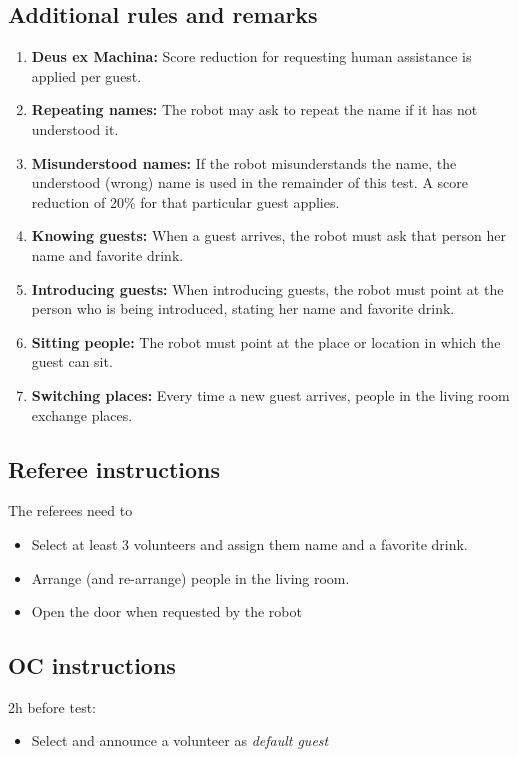\subsection{Additional rules and remarks}
\begin{enumerate}[nosep]
	\item \textbf{Deus ex Machina:} Score reduction for requesting human assistance is applied per guest.

	\item \textbf{Repeating names:} The robot may ask to repeat the name if it has not understood it.
	
	\item \textbf{Misunderstood names:} If the robot misunderstands the name, the understood (wrong) name is used in the remainder of this test.
	A score reduction of 20\%  for that particular guest applies.
	
	\item \textbf{Knowing guests:} When a guest arrives, the robot must ask that person her name and favorite drink.

	\item \textbf{Introducing guests:} When introducing guests, the robot must point at the person who is being introduced, stating her name and favorite drink.

	\item \textbf{Sitting people:} The robot must point at the place or location in which the guest can sit.

	\item \textbf{Switching places:} Every time a new guest arrives, people in the living room exchange places.
\end{enumerate}


\subsection{Referee instructions}

The referees need to
\begin{itemize}
	\item Select at least 3 volunteers and assign them name and a favorite drink.
	\item Arrange (and re-arrange) people in the living room.
	\item Open the door when requested by the robot
\end{itemize}

\subsection{OC instructions}

2h before test:
\begin{itemize}
	\item Select and announce a volunteer as \emph{default guest}
\end{itemize}

% 
